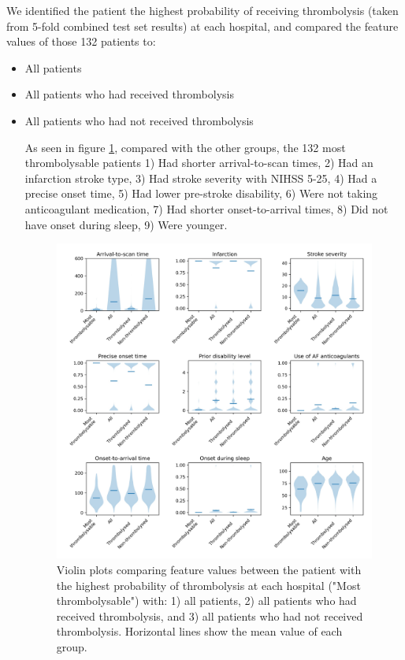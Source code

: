 We identified the patient  the highest probability of receiving thrombolysis (taken from 5-fold combined test set results) at each hospital, and compared the feature values of those 132 patients to:
\begin{itemize}
\item All patients
\item All patients who had received thrombolysis
\item All patients who had not received thrombolysis

As seen in figure \ref{fig:results_most_thrombolysable}, compared with the other groups, the 132 most thrombolysable patients 1) Had shorter arrival-to-scan times, 2) Had an infarction stroke type, 3) Had stroke severity with NIHSS 5-25, 4) Had a precise onset time, 5) Had lower pre-stroke disability, 6) Were not taking anticoagulant medication, 7) Had shorter onset-to-arrival times, 8) Did not have onset during sleep, 9) Were younger.

\begin{figure}
\centering
\includegraphics[width=1.0\textwidth]{./images/02a_most_thrombolsyable_violin}
\caption{Violin plots comparing feature values between the patient with the highest probability of thrombolysis at each hospital ("Most thrombolysable") with: 1) all patients, 2) all patients who had received thrombolysis, and 3) all patients who had not received thrombolysis. Horizontal lines show the mean value of each group.}
\label{fig:results_most_thrombolysable}
\end{figure}


\end{itemize}
